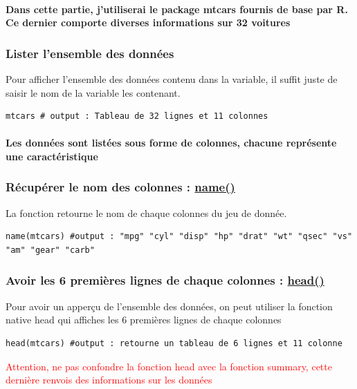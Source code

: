 \documentclass{article}
\newcommand{\warning}[1]{\textcolor{red}{#1}}
\begin{document}
\paragraph{Dans cette partie, j'utiliserai le package mtcars fournis de base par R. Ce dernier comporte diverses informations sur 32 voitures}

\subsubsection{Lister l'ensemble des données}

Pour afficher l'ensemble des données contenu dans la variable, il suffit juste de saisir le nom de la variable les contenant.
\begin{verbatim}
mtcars # output : Tableau de 32 lignes et 11 colonnes
\end{verbatim}

\paragraph{Les données sont listées sous forme de colonnes, chacune représente une caractéristique}

\subsubsection{Récupérer le nom des colonnes : \href{https://www.rdocumentation.org/packages/base/versions/3.6.2/topics/name}{name()}}
La fonction retourne le nom de chaque colonnes du jeu de donnée. 
\begin{verbatim}
name(mtcars) #output : "mpg" "cyl" "disp" "hp" "drat" "wt" "qsec" "vs" "am" "gear" "carb"
\end{verbatim}

\subsubsection{Avoir les 6 premières lignes de chaque colonnes : \href{https://www.rdocumentation.org/packages/utils/versions/3.6.2/topics/head}{head()} }
Pour avoir un apperçu de l'ensemble des données, on peut utiliser la fonction native head qui affiches les 6 premières lignes de chaque colonnes

\begin{verbatim}
head(mtcars) #output : retourne un tableau de 6 lignes et 11 colonne
\end{verbatim}

\warning{Attention, ne pas confondre la fonction head avec la fonction summary, cette dernière renvois des informations sur les données}
\end{document}
